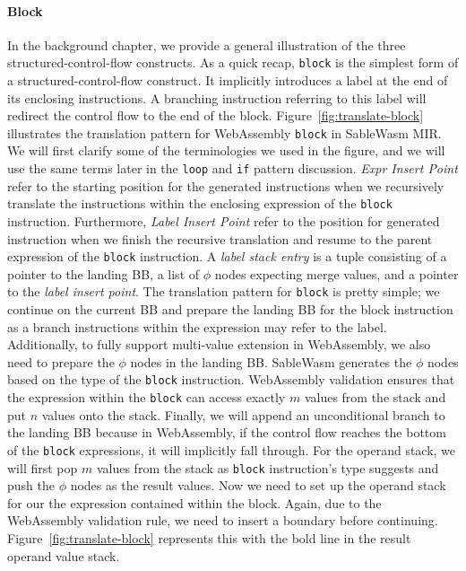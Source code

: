 \paragraph{Block}
In the background chapter, we provide a general illustration of the three
structured-control-flow constructs. As a quick recap, \texttt{block} is the
simplest form of a structured-control-flow construct. It implicitly introduces
a label at the end of its enclosing instructions. A branching instruction
referring to this label will redirect the control flow to the end of the block.
Figure~\ref{fig:translate-block} illustrates the translation pattern for
WebAssembly \texttt{block} in SableWasm MIR. We will first clarify some of the
terminologies we used in the figure, and we will use the same terms later in
the \texttt{loop} and \texttt{if} pattern discussion. \emph{Expr Insert Point}
refer to the starting position for the generated instructions when we
recursively translate the instructions within the enclosing expression of the
\texttt{block} instruction. Furthermore, \emph{Label Insert Point} refer to the
position for generated instruction when we finish the recursive translation and
resume to the parent expression of the \texttt{block} instruction. A \emph{label
  stack entry} is a tuple consisting of a pointer to the landing BB, a list of
$\phi$ nodes expecting merge values, and a pointer to the \emph{label insert
  point}. The translation pattern for \texttt{block} is pretty simple; we
continue on the current BB and prepare the landing BB for the block instruction
as a branch instructions within the expression may refer to the label.
Additionally, to fully support multi-value extension in WebAssembly, we also
need to prepare the $\phi$ nodes in the landing BB. SableWasm generates the
$\phi$ nodes based on the type of the \texttt{block} instruction. WebAssembly
validation ensures that the expression within the \texttt{block} can access
exactly $m$ values from the stack and put $n$ values onto the stack. Finally,
we will append an unconditional branch to the landing BB because in WebAssembly,
if the control flow reaches the bottom of the \texttt{block} expressions, it
will implicitly fall through. For the operand stack, we will first pop $m$
values from the stack as \texttt{block} instruction's type suggests and push the
$\phi$ nodes as the result values. Now we need to set up the operand stack for
our the expression contained within the block. Again, due to the WebAssembly
validation rule, we need to insert a boundary before continuing.
Figure~\ref{fig:translate-block} represents this with the bold line in the
result operand value stack.


